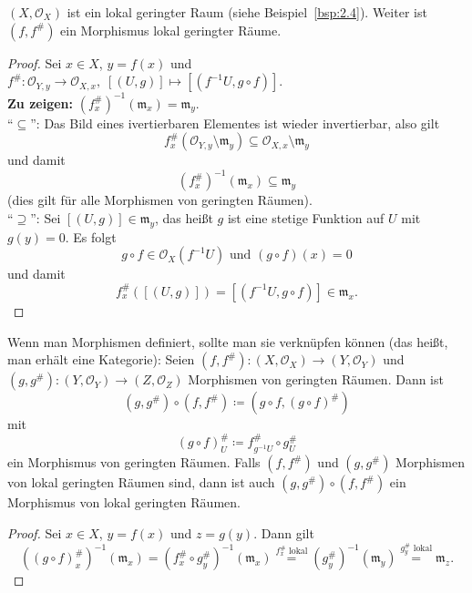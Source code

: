 \begin{bsp}
	$(X,\mathcal{O}_X)$ ist ein lokal geringter Raum (siehe Beispiel~\ref{bsp:2.4}). Weiter ist $(f,f^{\#})$ ein Morphismus lokal geringter Räume.
	\begin{proof}
		Sei $x \in X$, $y = f(x)$ und $f^{\#}\colon \mathcal{O}_{Y,y} \to \mathcal{O}_{X,x},\;[(U,g)]\mapsto [(f^{-1}U,g\circ f)]$.\\
		\textbf{Zu zeigen:} $(f^{\#}_x)^{-1}(\mathfrak{m}_x) = \mathfrak{m}_y$.\\
		\enquote{$\subseteq$}: Das Bild eines ivertierbaren Elementes ist wieder invertierbar, also gilt
		\[
			f^{\#}_x(\mathcal{O}_{Y,y}\setminus \mathfrak{m}_y) \subseteq \mathcal{O}_{X,x}\setminus \mathfrak{m}_y
		\]
		und damit
		\[
			(f_x^{\#})^{-1}(\mathfrak{m}_x) \subseteq \mathfrak{m}_y
		\]
		(dies gilt für alle Morphismen von geringten Räumen).\\
		\enquote{$\supseteq$}: Sei $[(U,g)]\in \mathfrak{m}_y$, das heißt $g$ ist eine stetige Funktion auf $U$ mit $g(y)=0$. Es folgt
		\[
			g \circ f \in \mathcal{O}_X(f^{-1}U) \text{ und } (g \circ f)(x)=0
		\]
		und damit
		\[
			f_x^{\#}([(U,g)]) = [(f^{-1}U,g\circ f)] \in \mathfrak{m}_x.
		\]
	\end{proof}
\end{bsp}

\begin{bem}
	Wenn man Morphismen definiert, sollte man sie verknüpfen können (das heißt, man erhält eine Kategorie): Seien $(f,f^{\#})\colon (X,\mathcal{O}_X) \to (Y,\mathcal{O}_Y)$ und $(g,g^{\#})\colon (Y,\mathcal{O}_Y) \to (Z,\mathcal{O}_Z)$ Morphismen von geringten Räumen. Dann ist
	\[
		(g,g^{\#}) \circ (f,f^{\#}) \coloneqq (g\circ f,(g\circ f)^{\#})
	\]
	mit
	\[
		(g\circ f)^{\#}_U \coloneqq f^{\#}_{g^{-1}U} \circ g^{\#}_U
	\]
	ein Morphismus von geringten Räumen. Falls $(f,f^{\#})$ und $(g,g^{\#})$ Morphismen von lokal geringten Räumen sind, dann ist auch $(g,g^{\#}) \circ (f,f^{\#})$ ein Morphismus von lokal geringten Räumen.
	\begin{proof}
		Sei $x \in X$, $y = f(x)$ und $z = g(y)$. Dann gilt
		\[
			((g\circ f)^{\#}_x)^{-1}(\mathfrak{m}_x) = (f^{\#}_x \circ g^{\#}_y)^{-1}(\mathfrak{m}_x) \overset{f^{\#}_x \text{ lokal}}{=} (g^{\#}_y)^{-1}(\mathfrak{m}_y) \overset{g^{\#}_y \text{ lokal}}{=} \mathfrak{m}_z.
		\]
	\end{proof}
\end{bem}
